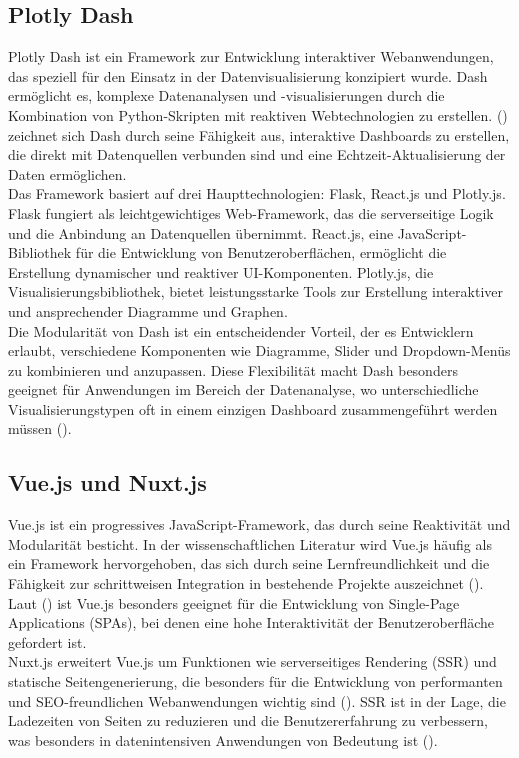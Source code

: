 \documentclass[a4paper, 12pt]{scrartcl}
\begin{document}
\subsection{Plotly Dash}
Plotly Dash ist ein Framework zur Entwicklung interaktiver Webanwendungen, das speziell für den Einsatz in der Datenvisualisierung konzipiert wurde. Dash ermöglicht es, komplexe Datenanalysen und -visualisierungen durch die Kombination von Python-Skripten mit reaktiven Webtechnologien zu erstellen. (\cite{Dabbas2021}) zeichnet sich Dash durch seine Fähigkeit aus, interaktive Dashboards zu erstellen, die direkt mit Datenquellen verbunden sind und eine Echtzeit-Aktualisierung der Daten ermöglichen.\\[1em] Das Framework basiert auf drei Haupttechnologien: Flask, React.js und Plotly.js. Flask fungiert als leichtgewichtiges Web-Framework, das die serverseitige Logik und die Anbindung an Datenquellen übernimmt. React.js, eine JavaScript-Bibliothek für die Entwicklung von Benutzeroberflächen, ermöglicht die Erstellung dynamischer und reaktiver UI-Komponenten. Plotly.js, die Visualisierungsbibliothek, bietet leistungsstarke Tools zur Erstellung interaktiver und ansprechender Diagramme und Graphen.\\[1em] Die Modularität von Dash ist ein entscheidender Vorteil, der es Entwicklern erlaubt, verschiedene Komponenten wie Diagramme, Slider und Dropdown-Menüs zu kombinieren und anzupassen. Diese Flexibilität macht Dash besonders geeignet für Anwendungen im Bereich der Datenanalyse, wo unterschiedliche Visualisierungstypen oft in einem einzigen Dashboard zusammengeführt werden müssen (\cite{Dabbas2021}).

\subsection{Vue.js und Nuxt.js}
Vue.js ist ein progressives JavaScript-Framework, das durch seine Reaktivität und Modularität besticht. In der wissenschaftlichen Literatur wird Vue.js häufig als ein Framework hervorgehoben, das sich durch seine Lernfreundlichkeit und die Fähigkeit zur schrittweisen Integration in bestehende Projekte auszeichnet (\cite{Li2021}). Laut (\cite{Novac2021}) ist Vue.js besonders geeignet für die Entwicklung von Single-Page Applications (SPAs), bei denen eine hohe Interaktivität der Benutzeroberfläche gefordert ist. \\[1em] Nuxt.js erweitert Vue.js um Funktionen wie serverseitiges Rendering (SSR) und statische Seitengenerierung, die besonders für die Entwicklung von performanten und SEO-freundlichen Webanwendungen wichtig sind (\cite{Gomes2023}). SSR ist in der Lage, die Ladezeiten von Seiten zu reduzieren und die Benutzererfahrung zu verbessern, was besonders in datenintensiven Anwendungen von Bedeutung ist (\cite{Sianandar2022}).
\end{document}
